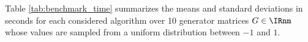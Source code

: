 

Table \ref{tab:benchmark_time} summarizes the means and standard deviations in seconds for each considered algorithm over 10 generator matrices $G\in\IRnm$ whose values are sampled from a uniform distribution between $-1$ and $1$.

